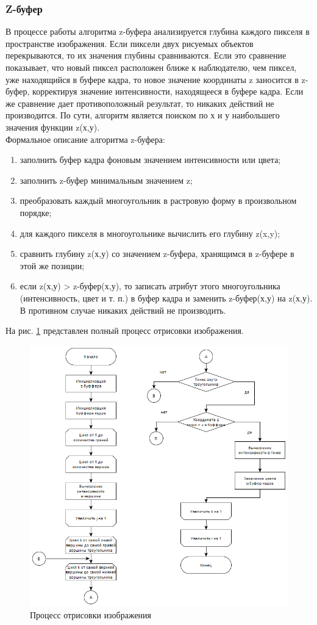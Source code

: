 \documentclass[54pt, a4paper]{article}
\begin{document}
	\subsubsection{Z-буфер}
	В процессе работы алгоритма z-буфера анализируется глубина каждого пикселя в пространстве изображения. Если пиксели двух рисуемых объектов перекрываются, то их значения глубины сравниваются. Если это сравнение показывает, что
	новый пиксел расположен ближе к наблюдателю, чем пиксел, уже находящийся в
	буфере кадра, то новое значение координаты z заносится в z-буфер, корректируя
	значение интенсивности, находящееся в буфере кадра. Если же сравнение дает противоположный результат, то никаких действий не производится. По сути, алгоритм
	является поиском по х и у наибольшего значения функции z(х,у).\\
	Формальное описание алгоритма z-буфера:
	\begin{enumerate}
		\item[1)]заполнить буфер кадра фоновым значением интенсивности или цвета;
		\item[2)]заполнить z-буфер минимальным значением z;
		\item[3)]преобразовать каждый многоугольник в растровую форму в произвольном
		порядке;
		\item[4)]для каждого пикселя в многоугольнике вычислить его глубину z(x,y);
		\item[5)]сравнить глубину z(х,у) со значением z-буфера, хранящимся в z-буфере в
		этой же позиции;
		\item[6)]если z(х,у) > z-буфер(х,у), то записать атрибут этого многоугольника (интенсивность, цвет и т. п.) в буфер кадра и заменить z-буфер(х,у) на z(х,у). В противном
		случае никаких действий не производить.
	\end{enumerate}
	На рис. \ref{ris:z}  представлен полный процесс отрисовки изображения.
	\begin{figure}[ht!]
		\centering
		\includegraphics[scale=1]{img/z.PNG}
		\caption{Процесс отрисовки изображения}
		\label{ris:z}
	\end{figure}
\end{document}
